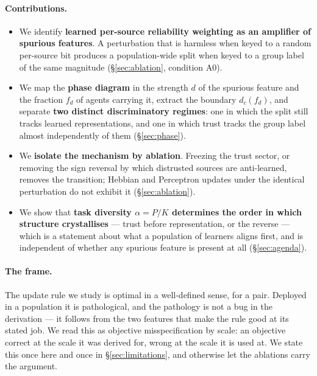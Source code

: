 \paragraph{Contributions.}
\begin{itemize}
  \item We identify \textbf{learned per-source reliability weighting as an
    amplifier of spurious features}. A perturbation that is harmless when keyed to
    a random per-source bit produces a population-wide split when keyed to a group
    label of the same magnitude (\S\ref{sec:ablation}, condition A0).
  \item We map the \textbf{phase diagram} in the strength $d$ of the spurious
    feature and the fraction $f_d$ of agents carrying it, extract the boundary
    $d_c(f_d)$, and separate \textbf{two distinct discriminatory regimes}: one in
    which the split still tracks learned representations, and one in which trust
    tracks the group label almost independently of them
    (\S\ref{sec:phase}).
  \item We \textbf{isolate the mechanism by ablation}. Freezing the trust sector,
    or removing the sign reversal by which distrusted sources are anti-learned,
    removes the transition; Hebbian and Perceptron updates under the identical
    perturbation do not exhibit it (\S\ref{sec:ablation}).
  \item We show that \textbf{task diversity $\alpha = P/K$ determines the order in
    which structure crystallises} --- trust before representation, or the reverse
    --- which is a statement about what a population of learners aligns first, and
    is independent of whether any spurious feature is present at all
    (\S\ref{sec:agenda}).
\end{itemize}

\paragraph{The frame.} The update rule we study is optimal in a well-defined
sense, for a pair. Deployed in a population it is pathological, and the
pathology is not a bug in the derivation --- it follows from the two features that
make the rule good at its stated job. We read this as objective misspecification
by scale: an objective correct at the scale it was derived for, wrong at the scale
it is used at. We state this once here and once in \S\ref{sec:limitations}, and
otherwise let the ablations carry the argument.

